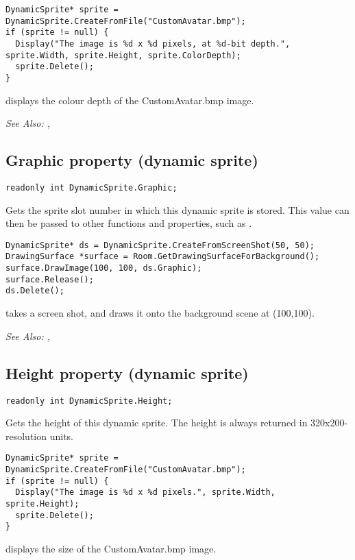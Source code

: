 \begin{verbatim}
DynamicSprite* sprite = DynamicSprite.CreateFromFile("CustomAvatar.bmp");
if (sprite != null) {
  Display("The image is %d x %d pixels, at %d-bit depth.", sprite.Width, sprite.Height, sprite.ColorDepth);
  sprite.Delete();
}
\end{verbatim}
displays the colour depth of the CustomAvatar.bmp image.

\it{See Also:} ,


\subsection{Graphic property (dynamic sprite)}\label{DynamicSprite.Graphic}%

\begin{verbatim}
readonly int DynamicSprite.Graphic;
\end{verbatim}
Gets the sprite slot number in which this dynamic sprite is stored.
This value can then be passed to other functions and properties, such as
.

\begin{verbatim}
DynamicSprite* ds = DynamicSprite.CreateFromScreenShot(50, 50);
DrawingSurface *surface = Room.GetDrawingSurfaceForBackground();
surface.DrawImage(100, 100, ds.Graphic);
surface.Release();
ds.Delete();
\end{verbatim}
takes a screen shot, and draws it onto the background scene at (100,100).

\it{See Also:} ,


\subsection{Height property (dynamic sprite)}\label{DynamicSprite.Height}%

\begin{verbatim}
readonly int DynamicSprite.Height;
\end{verbatim}
Gets the height of this dynamic sprite. The height is always returned in 320x200-resolution units.

\begin{verbatim}
DynamicSprite* sprite = DynamicSprite.CreateFromFile("CustomAvatar.bmp");
if (sprite != null) {
  Display("The image is %d x %d pixels.", sprite.Width, sprite.Height);
  sprite.Delete();
}
\end{verbatim}
displays the size of the CustomAvatar.bmp image.


